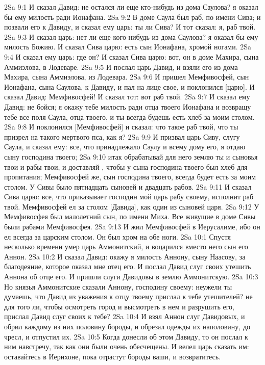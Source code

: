 \vs 2Sa 9:1 И сказал Давид: не остался ли еще кто-нибудь из дома Саулова? я оказал бы ему милость ради Ионафана.
\vs 2Sa 9:2 В доме Саула был раб, по имени Сива; и позвали его к Давиду, и сказал ему царь: ты ли Сива? И тот сказал: я, раб твой.
\vs 2Sa 9:3 И сказал царь: нет ли еще кого-нибудь из дома Саулова? я оказал бы ему милость Божию. И сказал Сива царю: есть сын Ионафана, хромой ногами.
\vs 2Sa 9:4 И сказал ему царь: где он? И сказал Сива царю: вот, он в доме Махира, сына Аммиэлова, в Лодеваре.
\vs 2Sa 9:5 И послал царь Давид, и взяли его из дома Махира, сына Аммиэлова, из Лодевара.
\vs 2Sa 9:6 И пришел Мемфивосфей, сын Ионафана, сына Саулова, к Давиду, и пал на лице свое, и поклонился [царю]. И сказал Давид: Мемфивосфей! И сказал тот: вот раб твой.
\vs 2Sa 9:7 И сказал ему Давид: не бойся; я окажу тебе милость ради отца твоего Ионафана и возвращу тебе все поля Саула, отца твоего, и ты всегда будешь есть хлеб за моим столом.
\vs 2Sa 9:8 И поклонился [Мемфивосфей] и сказал: что такое раб твой, что ты призрел на такого мертвого пса, как я?
\vs 2Sa 9:9 И призвал царь Сиву, слугу Саула, и сказал ему: все, что принадлежало Саулу и всему дому его, я отдаю сыну господина твоего;
\vs 2Sa 9:10 итак обрабатывай для него землю ты и сыновья твои и рабы твои, и доставляй , чтобы у сына господина твоего был хлеб для пропитания; Мемфивосфей же, сын господина твоего, всегда будет есть за моим столом. У Сивы было пятнадцать сыновей и двадцать рабов.
\vs 2Sa 9:11 И сказал Сива царю: все, что приказывает господин мой царь рабу своему, исполнит раб твой. Мемфивосфей ел за столом [Давида], как один из сыновей царя.
\vs 2Sa 9:12 У Мемфивосфея был малолетний сын, по имени Миха. Все живущие в доме Сивы были рабами Мемфивосфея.
\vs 2Sa 9:13 И жил Мемфивосфей в Иерусалиме, ибо он ел всегда за царским столом. Он был хром на обе ноги.
\vs 2Sa 10:1 Спустя несколько времени умер царь Аммонитский, и воцарился вместо него сын его Аннон.
\vs 2Sa 10:2 И сказал Давид: окажу я милость Аннону, сыну Наасову, за благодеяние, которое оказал мне отец его. И послал Давид слуг своих утешить Аннона об отце его. И пришли слуги Давидовы в землю Аммонитскую.
\vs 2Sa 10:3 Но князья Аммонитские сказали Аннону, господину своему: неужели ты думаешь, что Давид из уважения к отцу твоему прислал к тебе утешителей? не для того ли, чтобы осмотреть город и высмотреть в нем и  разрушить его, прислал Давид слуг своих к тебе?
\vs 2Sa 10:4 И взял Аннон слуг Давидовых, и обрил каждому из них половину бороды, и обрезал одежды их наполовину, до чресл, и отпустил их.
\vs 2Sa 10:5 Когда донесли об этом Давиду, то он послал к ним навстречу, так как они были очень обесчещены. И велел царь сказать им: оставайтесь в Иерихоне, пока отрастут бороды ваши, и  возвратитесь.
